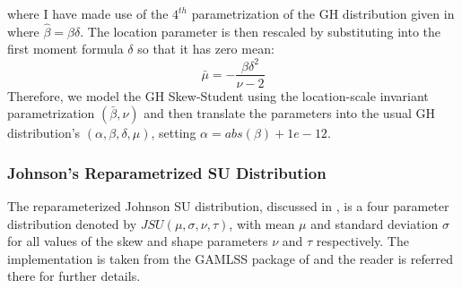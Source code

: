 where I have made use of the $4^{th}$ parametrization of the GH distribution given in
\cite{Prause1999} where $\hat \beta = \beta \delta$. The location parameter is then rescaled
by substituting into the first moment formula $\delta$ so that it has zero mean:
\begin{equation}
\bar \mu  =  - \frac{{\beta {\delta ^2}}}{{\nu  - 2}}
\end{equation}
Therefore, we model the GH Skew-Student using the location-scale invariant parametrization $(\bar \beta, \nu)$
and then translate the parameters into the usual GH distribution's $(\alpha, \beta, \delta, \mu)$, setting
$\alpha = abs(\beta)+1e-12$.
\subsubsection{Johnson's Reparametrized SU Distribution}\label{jsu}
The reparameterized Johnson SU distribution, discussed in \cite{Rigby2005}, is a
four parameter distribution denoted by $JSU\left(\mu,\sigma,\nu,\tau\right)$,
with mean $\mu$ and standard deviation $\sigma$ for all values of the skew and
shape parameters $\nu$ and $\tau$ respectively. The implementation is taken
from the GAMLSS package of \cite{Stasinopoulos2009} and the reader is referred
there for further details.

